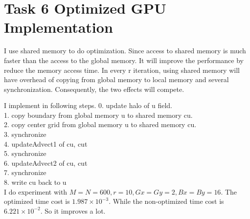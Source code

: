 \section{Task 6 Optimized GPU Implementation}

I use shared memory to do optimization. Since access to shared memory is much 
faster than the access to the global memory. It will improve the performance 
by reduce the memory access time. In every r iteration, using shared memory will
have overhead of copying from global memory to local memory and several synchronization.
Consequently, the two effects will compete.

I implement in following steps.
 0. update halo of u field. \\
 1. copy boundary from global memory u to shared memory cu. \\
 2. copy center grid from global memory u to shared memory cu. \\
 3. synchronize \\
 4. updateAdvect1 of cu, cut \\
 5. synchronize \\
 6. updateAdvect2 of cu, cut \\
 7. synchronize \\
 8. write cu back to u \\

I do experiment with $M=N=600, r=10, Gx=Gy=2, Bx=By=16$. 
The optimized time cost is $1.987\times 10^{-3}$.
While the non-optimized time cost is $6.221\times 10^{-2}$.
So it improves a lot.
